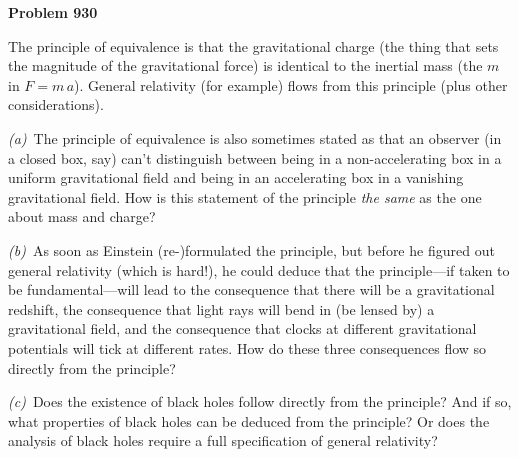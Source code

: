 \documentclass[12pt]{article}
\begin{document}
\begin{pottproblem}
\textbf{Problem 930}

The principle of equivalence is that the gravitational charge (the
thing that sets the magnitude of the gravitational force) is identical
to the inertial mass (the $m$ in $F=m\,a$). General relativity (for
example) flows from this principle (plus other considerations).

\textsl{(a)}~The principle of equivalence is also sometimes stated as
that an observer (in a closed box, say) can't distinguish between
being in a non-accelerating box in a uniform gravitational field and
being in an accelerating box in a vanishing gravitational field. How
is this statement of the principle \emph{the same} as the one about
mass and charge?

\textsl{(b)}~As soon as Einstein (re-)formulated the principle, but
before he figured out general relativity (which is hard!), he could
deduce that the principle---if taken to be fundamental---will lead to
the consequence that there will be a gravitational redshift, the
consequence that light rays will bend in (be lensed by) a
gravitational field, and the consequence that clocks at different
gravitational potentials will tick at different rates. How do these
three consequences flow so directly from the principle?

\textsl{(c)}~Does the existence of black holes follow directly from
the principle? And if so, what properties of black holes can be
deduced from the principle? Or does the analysis of black holes
require a full specification of general relativity?

\end{pottproblem}
\end{document}
